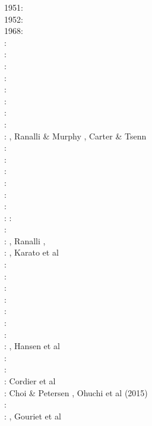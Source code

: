 {\scriptsize
1951: \cite{druc51}\cite{hafn51}\\
1952: \cite{drpr52}\\
1968: \cite{byer68}\\
\nineteensixtynine: \cite{hand69}\\
\nineteenseventytwo: \cite{carr72}\\
\nineteenseventyfour: \cite{kogo74}\\
\nineteenseventynine: \cite{goev79}\cite{evgo79}\\
\nineteeneighty: \cite{brko80}\\
\nineteeneightyone: \cite{delo81}\\
\nineteeneightyfour: \cite{rafi84}\cite{chpa84}\cite{vede84}\\
\nineteeneightysix: \cite{kapf86}\\
\nineteeneightyseven: \cite{kikr87}, Ranalli \& Murphy \cite{ramu87}, Carter \& Tsenn \cite{cats87}\\
\nineteenninety: \cite{wica90}\\
\nineteenninetytwo: \cite{bako92}\cite{chbo92}\cite{kali92}\cite{kohl92}\\
\nineteenninetythree: \cite{kawu93}\\
\nineteenninetyfour: \cite{fran94}\\
\nineteenninetyfive: \cite{koem95}\cite{gltu95}\\
\nineteenninetysix: \cite{wasd96}\cite{hiko96}\\
\nineteenninetyseven: \cite{eshe97a,eshe97b}
\nineteenninetyeight: \cite{copo98}\cite{mazk98}\\
\nineteenninetynine: \cite{kayk99}\\
\twothousand: \cite{rydr00}, Ranalli \cite{rana00}, \cite{meko00a,meko00b}\\
\twothousandone: \cite{lova01}, Karato et al \cite{kary01}\\
\twothousandtwo: \cite{hirt02}\\
\twothousandthree: \cite{hiko03}\cite{kaju03}\cite{mohi03}\\
\twothousandfive: \cite{didr05}\cite{drur05}\\
\twothousandsix: \cite{rygw06}\cite{buwa06}\cite{momu06}\cite{liwr06}\\
\twothousandseven: \cite{hirw07}\cite{kohl07}\cite{faja07}\\
\twothousandeight: \cite{lemm08}\cite{budr08}\cite{koka08}\cite{gird08}\\
\twothousandnine: \cite{kayk09}\cite{kako09}\\
\twothousandeleven: \cite{lell11}\cite{kemk11}, Hansen et al \cite{hazk11}\\
\twothousandtwelve: \cite{reyn12}\\
\twothousandthirteen: \cite{lepo13}\cite{miam13}\cite{mont13}\\
\twothousandfourteen: Cordier et al \cite{codb14}\\
\twothousandfifteen: Choi \& Petersen \cite{chpe15}, Ohuchi et al (2015) \cite{ohkh15}\\
\twothousandseventeen: \cite{bocc17}\\
\twothousandnineteen: \cite{rejv19}\cite{hakt19}, Gouriet et al \cite{gocg19}
}


